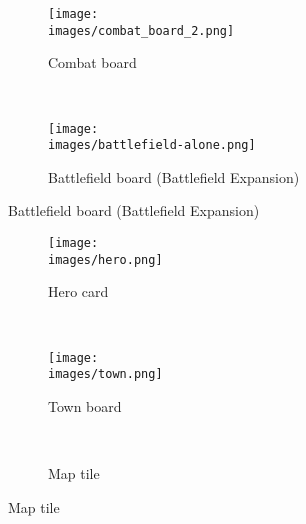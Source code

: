 
\begin{figure}[H]
  \centering
  \begin{subfigure}[b]{0.4\linewidth}
    \texttt{[image: \\images/combat\_board\_2.png]}
    \caption{\centering Combat board}
  \end{subfigure}
  ~
  \begin{subfigure}[b]{0.5\linewidth}
    \texttt{[image: \\images/battlefield-alone.png]}
    \caption{\centering Battlefield board (Battlefield Expansion)}
  \end{subfigure}
\end{figure}
\vspace*{-2em}
\begin{figure}[H]
  \centering
  \begin{subfigure}[b]{0.3\linewidth}
    \texttt{[image: \\images/hero.png]}
    \caption{\centering Hero card}
  \end{subfigure}
  ~
  \begin{subfigure}[b]{0.3\linewidth}
    \texttt{[image: \\images/town.png]}
    \caption{\centering Town board}
  \end{subfigure}
  ~
  \begin{subfigure}[b]{0.3\linewidth}
    \centering
    \caption{\centering Map tile}
  \end{subfigure}
\end{figure}
\vspace*{-2em}
